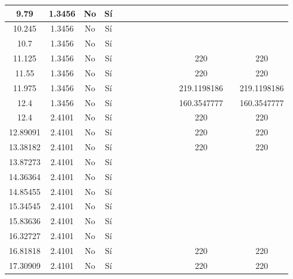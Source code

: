 \begin{table}[H]
{\begin{tabular}{|c|c|c|c|c|c|c|c|c|c|c|c|c|c|}
\hline
9.79 & 1.3456 & No  & Sí  &     &     &     &     &     &     &     &     &     &  \bigstrut\\
\hline
10.245 & 1.3456 & No  & Sí  &     &     &     &     &     &     &     &     &     &  \bigstrut\\
\hline
10.7 & 1.3456 & No  & Sí  &     &     &     &     &     &     &     &     &     &  \bigstrut\\
\hline
11.125 & 1.3456 & No  & Sí  &     &     &     &     &     &     &     & 220 &     & 220 \bigstrut\\
\hline
11.55 & 1.3456 & No  & Sí  &     &     &     &     &     &     &     & 220 &     & 220 \bigstrut\\
\hline
11.975 & 1.3456 & No  & Sí  &     &     &     &     &     &     &     & 219.1198186 &     & 219.1198186 \bigstrut\\
\hline
12.4 & 1.3456 & No  & Sí  &     &     &     &     &     &     &     & 160.3547777 &     & 160.3547777 \bigstrut\\
\hline
12.4 & 2.4101 & No  & Sí  &     &     &     &     &     &     &     & 220 &     & 220 \bigstrut\\
\hline
12.89091 & 2.4101 & No  & Sí  &     &     &     &     &     &     &     & 220 &     & 220 \bigstrut\\
\hline
13.38182 & 2.4101 & No  & Sí  &     &     &     &     &     &     &     & 220 &     & 220 \bigstrut\\
\hline
13.87273 & 2.4101 & No  & Sí  &     &     &     &     &     &     &     &     &     &  \bigstrut\\
\hline
14.36364 & 2.4101 & No  & Sí  &     &     &     &     &     &     &     &     &     &  \bigstrut\\
\hline
14.85455 & 2.4101 & No  & Sí  &     &     &     &     &     &     &     &     &     &  \bigstrut\\
\hline
15.34545 & 2.4101 & No  & Sí  &     &     &     &     &     &     &     &     &     &  \bigstrut\\
\hline
15.83636 & 2.4101 & No  & Sí  &     &     &     &     &     &     &     &     &     &  \bigstrut\\
\hline
16.32727 & 2.4101 & No  & Sí  &     &     &     &     &     &     &     &     &     &  \bigstrut\\
\hline
16.81818 & 2.4101 & No  & Sí  &     &     &     &     &     &     &     & 220 &     & 220 \bigstrut\\
\hline
17.30909 & 2.4101 & No  & Sí  &     &     &     &     &     &     &     & 220 &     & 220 \bigstrut\\

\end{tabular}}
\end{table}
